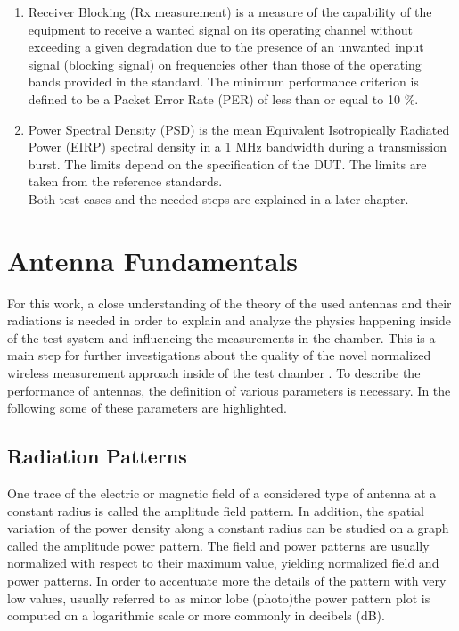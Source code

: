 \begin{enumerate}
\item Receiver Blocking (Rx measurement) is a measure of the capability of the equipment to receive a wanted signal on its operating channel without exceeding a given degradation due to the presence of an unwanted input signal (blocking signal) on frequencies other than those of the operating bands provided in the standard. The minimum performance criterion is defined to be a Packet Error Rate (PER) of less than or equal to 10 \%.




\item Power Spectral Density (PSD) is the mean Equivalent Isotropically Radiated Power (EIRP) spectral density in a 1 MHz bandwidth during a transmission burst. The limits depend on the specification of the DUT. The limits are taken from the reference standards.\\
Both test cases and the needed steps are explained in a later chapter.
\end{enumerate}

\section{Antenna Fundamentals}

For this work, a close understanding of the theory of the used antennas and their radiations is needed in order to explain and analyze the physics happening inside of the test system and influencing the measurements in the chamber. This is a main step for further investigations about the quality of the novel normalized wireless measurement approach inside of the test chamber . To describe the performance of antennas, the definition of various parameters is necessary. In the following some of these parameters are highlighted.




\subsection{Radiation Patterns}

One trace of the electric or magnetic field of a considered type of antenna at a constant radius is called the amplitude field pattern. In addition, the spatial variation of the power density along a constant radius can be studied on a graph called the amplitude power pattern. The field and power patterns are usually normalized with respect to their maximum value, yielding normalized field and power patterns. In order to accentuate more the details of the pattern with very low values, usually referred to as minor lobe (photo)the power pattern plot is computed on a logarithmic scale or more commonly in decibels (dB).

